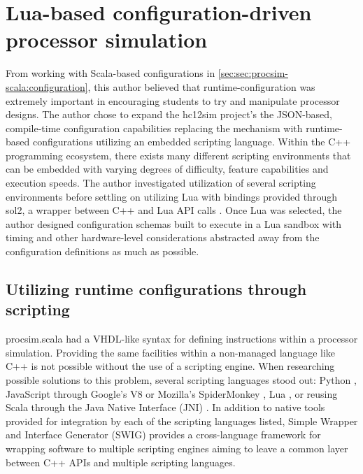 \chapter{Lua-based configuration-driven processor simulation}
\label{ch:lua}

\newcommand{\luainline}[1]{\texttt{#1}}

 From working with Scala-based configurations in \cref{sec:sec:procsim-scala:configuration}, this author believed that runtime-configuration was extremely important in encouraging students to try and manipulate processor designs. The author chose to expand the hc12sim project's the JSON-based, compile-time configuration capabilities replacing the mechanism with runtime-based configurations utilizing an embedded scripting language. Within the C++ programming ecosystem, there exists many different scripting environments that can be embedded with varying degrees of difficulty, feature capabilities and execution speeds. The author investigated utilization of several scripting environments before settling on utilizing Lua \cite{Lua:Homepage} with bindings provided through sol2, a wrapper between C++ and Lua API calls \cite{Github:ThePhD:sol2}. Once Lua was selected, the author designed configuration schemas built to execute in a Lua sandbox with timing and other hardware-level considerations abstracted away from the configuration definitions as much as possible.

\section{Utilizing runtime configurations through scripting}

procsim.scala had a VHDL-like syntax for defining instructions within a processor simulation. Providing the same facilities within a non-managed language like C++ is not possible without the use of a scripting engine. When researching possible solutions to this problem, several scripting languages stood out: Python \cite{Python:Homepage}, JavaScript through Google's V8 \cite{Google:V8} or Mozilla's SpiderMonkey \cite{MDN:SpiderMonkey}, Lua \cite{Lua:Homepage}, or reusing Scala through the Java Native Interface (JNI) \cite{Oracle:JNI}. In addition to native tools provided for integration by each of the scripting languages listed, Simple Wrapper and Interface Generator (SWIG) \cite{SWIG:Homepage} provides a cross-language framework for wrapping software to multiple scripting engines aiming to leave a common layer between C++ APIs and multiple scripting languages.

